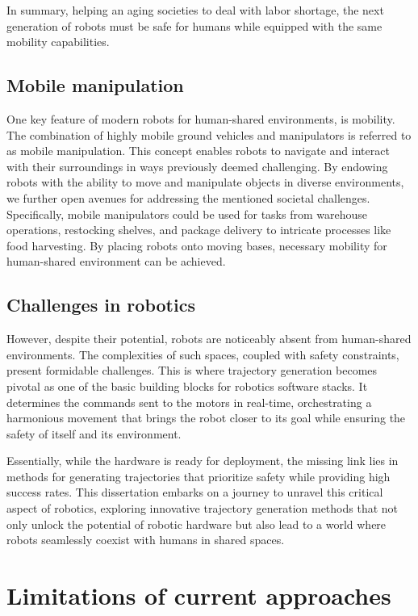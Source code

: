 In summary, helping an aging societies to deal with labor shortage,
the next generation of robots must be safe for humans while
equipped with the same mobility capabilities.

\subsection{Mobile manipulation}

One key feature of modern robots for human-shared
environments, is mobility. The combination of highly mobile
ground vehicles and manipulators is referred to as mobile
manipulation. This concept enables robots to navigate and
interact with their surroundings in ways previously deemed
challenging. By endowing robots with the ability to move and
manipulate objects in diverse environments, we further open
avenues for addressing the mentioned societal challenges.
Specifically, mobile manipulators could be used for tasks
from warehouse operations, restocking shelves, and package
delivery to intricate processes like food harvesting.
By placing robots onto moving bases, necessary mobility for
human-shared environment can be achieved.

\subsection{Challenges in robotics}

However, despite their potential, robots are noticeably
absent from human-shared environments. The complexities of
such spaces, coupled with safety constraints, present
formidable challenges. This is where trajectory generation
becomes pivotal as one of the basic building blocks for
robotics software stacks. It determines the commands sent to
the motors in real-time, orchestrating a harmonious movement
that brings the robot closer to its goal while ensuring the
safety of itself and its environment.

Essentially, while the hardware is ready for deployment, the
missing link lies in methods for generating trajectories
that prioritize safety while providing high success rates.
This dissertation embarks on a journey to unravel this
critical aspect of robotics, exploring innovative trajectory
generation methods that not only unlock the potential of
robotic hardware but also lead to a world where robots
seamlessly coexist with humans in shared spaces.

\section{Limitations of current approaches}


